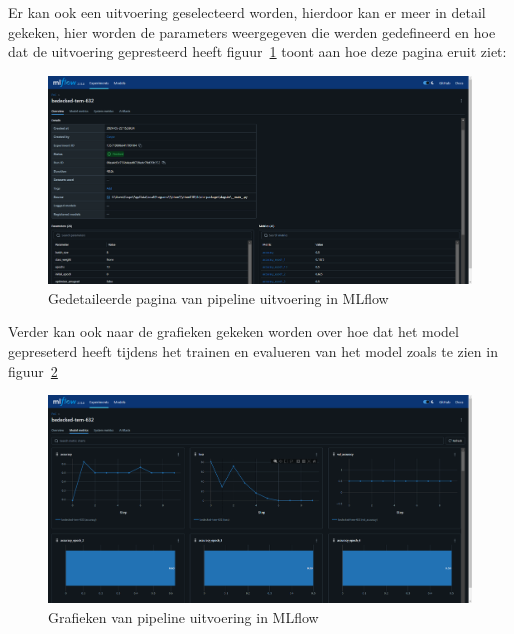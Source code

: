 Er kan ook een uitvoering geselecteerd worden, hierdoor kan er meer in detail gekeken, hier worden de parameters weergegeven die werden gedefineerd en hoe dat de uitvoering gepresteerd heeft figuur~\ref{fig:MLflow_informatie} toont aan hoe deze pagina eruit ziet:
\begin{figure}
    \centering
    \includegraphics[width=0.9\linewidth]{graphics/MLflow_Information.PNG}
    \caption{Gedetaileerde pagina van pipeline uitvoering in MLflow}
    \label{fig:MLflow_informatie}
\end{figure}
Verder kan ook naar de grafieken gekeken worden over hoe dat het model gepreseterd heeft tijdens het trainen en evalueren van het model zoals te zien in figuur~\ref{fig:MLflow_graph}
\begin{figure}
    \centering
    \includegraphics[width=0.9\linewidth]{graphics/mlflow_Graph.PNG}
    \caption{Grafieken van pipeline uitvoering in MLflow}
    \label{fig:MLflow_graph}
\end{figure}